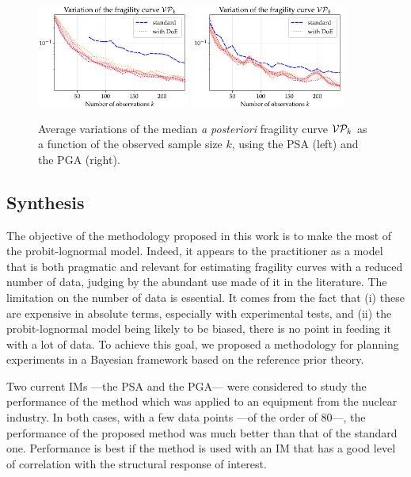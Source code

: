     
    \begin{figure}[h]
        \centering%
        \includegraphics[width=5cm]{figures/DoE/VariaP_PSA.pdf}\ 
        \includegraphics[width=5cm]{figures/DoE/VariaP_PGA.pdf}
        \caption{Average variations of the median \emph{a posteriori} fragility curve $\mathcal{V}\mathcal{P}_k$ as a function of the observed sample size $k$, using the PSA (left) and the PGA (right).}
        \label{fig:doe:variaP}
    \end{figure}



    \subsection{Synthesis}




    The objective of the methodology proposed in this work is to make the most of the {probit-}lognormal model. Indeed, it appears to the practitioner as a model that is both pragmatic and relevant for estimating fragility curves with a reduced number of data, judging by the abundant use made of it in the literature. The {limitation} on the number of data is essential. It comes from the fact that (i) these are expensive in absolute terms, especially %
with experimental tests, and (ii) the {probit-}lognormal model being likely to be biased, there is no point in feeding it with a lot of data. To achieve this goal, we proposed a methodology for planning experiments in a Bayesian framework based on the reference prior theory.

Two current IMs ---the PSA and the PGA--- were considered to study the performance of the method which was applied to an equipment from the nuclear industry. In both cases, with a few data points ---of the order of 80---, the performance of the proposed method was much better than that of the standard one. Performance is best if the method is used with an IM that has a good level of correlation with the structural response of interest.

